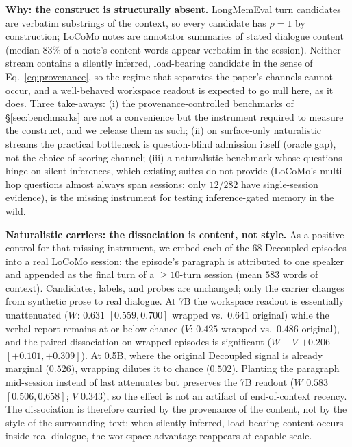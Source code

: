 \textbf{Why: the construct is structurally absent.} LongMemEval turn
candidates are verbatim substrings of the context, so every candidate has
$\rho{=}1$ by construction; LoCoMo notes are annotator summaries of stated
dialogue content (median $83\%$ of a note's content words appear verbatim
in the session). Neither stream contains a silently inferred, load-bearing
candidate in the sense of Eq.~\ref{eq:provenance}, so the regime that
separates the paper's channels cannot occur, and a well-behaved workspace
readout is expected to go null here, as it does. Three take-aways: (i) the
provenance-controlled benchmarks of \S\ref{sec:benchmarks} are not a
convenience but the instrument required to measure the construct, and we
release them as such; (ii) on surface-only naturalistic streams the
practical bottleneck is question-blind admission itself (oracle gap), not
the choice of scoring channel; (iii) a naturalistic benchmark whose
questions hinge on silent inferences, which existing suites do not provide
(LoCoMo's multi-hop questions almost always span sessions; only $12/282$
have single-session evidence), is the missing instrument for testing
inference-gated memory in the wild.

\textbf{Naturalistic carriers: the dissociation is content, not style.} As a
positive control for that missing instrument, we embed each of the $68$
Decoupled episodes into a real LoCoMo session: the episode's paragraph is
attributed to one speaker and appended as the final turn of a ${\ge}10$-turn
session (mean $583$ words of context). Candidates, labels, and probes are
unchanged; only the carrier changes from synthetic prose to real dialogue. At
7B the workspace readout is essentially unattenuated ($W$: $0.631$
$[0.559, 0.700]$ wrapped vs.\ $0.641$ original) while the verbal report
remains at or below chance ($V$: $0.425$ wrapped vs.\ $0.486$ original), and
the paired dissociation on wrapped episodes is significant
($W{-}V$ $+0.206$ $[+0.101, +0.309]$). At 0.5B, where the original Decoupled
signal is already marginal ($0.526$), wrapping dilutes it to chance
($0.502$). Planting the paragraph mid-session instead of last attenuates but
preserves the 7B readout ($W$ $0.583$ $[0.506, 0.658]$; $V$ $0.343$), so the
effect is not an artifact of end-of-context recency. The dissociation is therefore carried by the provenance of the
content, not by the style of the surrounding text: when silently inferred,
load-bearing content occurs inside real dialogue, the workspace advantage
reappears at capable scale.

